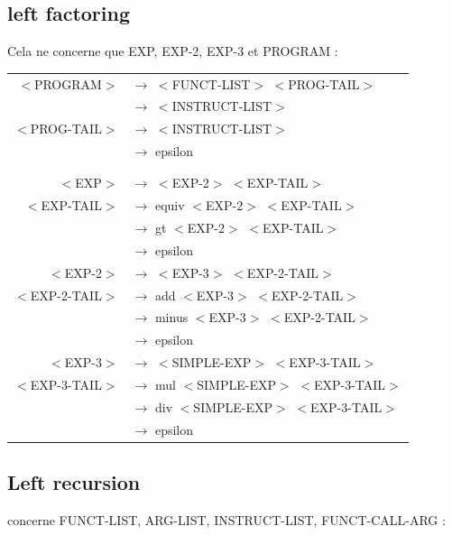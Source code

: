 \documentclass[a4paper,10pt]{article}
\begin{document}
\subsection{left factoring}
	Cela ne concerne que EXP, EXP-2, EXP-3 et PROGRAM : \\
	\begin{center}\begin{tabular}{rl}
		$<$PROGRAM$>$		& $\rightarrow$ $<$FUNCT-LIST$>$ $<$PROG-TAIL$>$\\
							& $\rightarrow$ $<$INSTRUCT-LIST$>$\\
		$<$PROG-TAIL$>$		& $\rightarrow$ $<$INSTRUCT-LIST$>$\\
							& $\rightarrow$ epsilon\\
							&\\
							&\\
		$<$EXP$>$			& $\rightarrow$ $<$EXP-2$>$ $<$EXP-TAIL$>$ \\

		$<$EXP-TAIL$>$		& $\rightarrow$ equiv $<$EXP-2$>$ $<$EXP-TAIL$>$\\
							& $\rightarrow$ gt $<$EXP-2$>$ $<$EXP-TAIL$>$\\ 
							& $\rightarrow$ epsilon \\
					
		$<$EXP-2$>$			& $\rightarrow$ $<$EXP-3$>$ $<$EXP-2-TAIL$>$ \\

		$<$EXP-2-TAIL$>$	& $\rightarrow$ add $<$EXP-3$>$ $<$EXP-2-TAIL$>$\\
							& $\rightarrow$ minus $<$EXP-3$>$ $<$EXP-2-TAIL$>$\\ 
							& $\rightarrow$ epsilon \\
					
		$<$EXP-3$>$			& $\rightarrow$ $<$SIMPLE-EXP$>$ $<$EXP-3-TAIL$>$ \\

		$<$EXP-3-TAIL$>$	& $\rightarrow$ mul $<$SIMPLE-EXP$>$ $<$EXP-3-TAIL$>$\\
							& $\rightarrow$ div $<$SIMPLE-EXP$>$ $<$EXP-3-TAIL$>$\\ 
							& $\rightarrow$ epsilon \\				
	\end{tabular}\end{center}







\subsection{Left recursion}
	concerne FUNCT-LIST, ARG-LIST, INSTRUCT-LIST, FUNCT-CALL-ARG : \\
\end{document}
